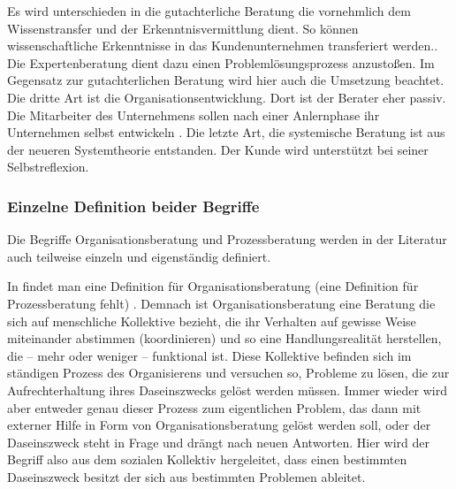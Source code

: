 Es wird unterschieden in die gutachterliche Beratung die \glqq vornehmlich dem Wissenstransfer und der Erkenntnisvermittlung \grqq dient. So können \glqq wissenschaftliche Erkenntnisse in das Kundenunternehmen transferiert werden.\grqq . Die Expertenberatung dient dazu einen \glqq Problemlösungsprozess \grqq anzustoßen. Im Gegensatz zur gutachterlichen Beratung wird hier auch die Umsetzung beachtet. Die dritte Art ist die Organisationsentwicklung. Dort ist der Berater \glqq eher passiv\grqq. 
Die Mitarbeiter des Unternehmens sollen nach einer Anlernphase ihr Unternehmen selbst \glqq entwickeln \grqq . 
Die letzte Art, die systemische Beratung ist aus der neueren Systemtheorie entstanden. Der Kunde wird unterstützt \glqq bei seiner Selbstreflexion\grqq. 

\subsubsection*{Einzelne Definition beider Begriffe}
Die Begriffe Organisationsberatung und Prozessberatung werden in der Literatur auch teilweise einzeln und eigenständig definiert.

In \cite[28]{MuellerNagel} findet man eine Definition für Organisationsberatung (eine Definition für Prozessberatung fehlt) . Demnach ist Organisationsberatung eine Beratung die \glqq  sich auf menschliche Kollektive bezieht, die ihr Verhalten auf gewisse Weise miteinander abstimmen (koordinieren) und so eine Handlungsrealität herstellen, die – mehr oder weniger – funktional ist. Diese Kollektive befinden sich im ständigen Prozess des Organisierens und versuchen so, Probleme zu lösen, die zur Aufrechterhaltung ihres Daseinszwecks gelöst werden müssen. Immer wieder wird aber entweder genau dieser Prozess zum eigentlichen Problem, das dann mit externer Hilfe in Form von Organisationsberatung gelöst werden soll, oder der Daseinszweck steht in Frage und drängt nach neuen Antworten.
\grqq Hier wird der Begriff also aus dem sozialen Kollektiv hergeleitet, dass einen bestimmten Daseinszweck besitzt der sich aus bestimmten Problemen ableitet.

